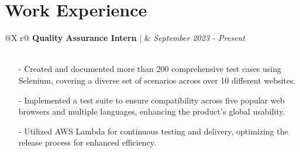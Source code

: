 \documentclass[a4paper,12pt]{article}
\begin{document}

\section{Work Experience}

\begin{tabularx}{\linewidth}{ @{}X r@{} }
    {\textbf{Quality Assurance Intern}} $\vert$ & \textit{September 2023 - Present} \\
     \\
\end{tabularx}

\begin{minipage}{\linewidth}
    \begin{itemize}[nosep,after=\strut, leftmargin=1em]
        \item[-] Created and documented more than 200 comprehensive test cases using Selenium, covering a diverse set of scenarios across over 10 different websites.
        \item[-] Implemented a test suite to ensure compatibility across five popular web browsers and multiple languages, enhancing the product's global usability.
        \item[-] Utilized AWS Lambda for continuous testing and delivery, optimizing the release process for enhanced efficiency.
    \end{itemize}
\end{minipage}
\end{document}
